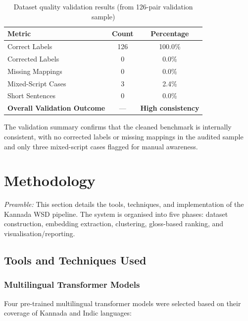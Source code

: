 \documentclass[12pt,a4paper,oneside]{article}
\begin{document}
\begin{table}[H]
\centering
\caption{Dataset quality validation results (from 126-pair validation sample)}
\label{tab:quality}
\begin{tabular}{l c c}
\toprule
\textbf{Metric} & \textbf{Count} & \textbf{Percentage} \\
\midrule
Correct Labels & 126 & 100.0\% \\
Corrected Labels & 0 & 0.0\% \\
Missing Mappings & 0 & 0.0\% \\
Mixed-Script Cases & 3 & 2.4\% \\
Short Sentences & 0 & 0.0\% \\
\midrule
\textbf{Overall Validation Outcome} & --- & \textbf{High consistency} \\
\bottomrule
\end{tabular}
\end{table}

The validation summary confirms that the cleaned benchmark is internally consistent, with no corrected labels or missing mappings in the audited sample and only three mixed-script cases flagged for manual awareness.

\clearpage

\section{Methodology}

\textit{Preamble:} This section details the tools, techniques, and implementation of the Kannada WSD pipeline. The system is organised into five phases: dataset construction, embedding extraction, clustering, gloss-based ranking, and visualisation/reporting.

\subsection{Tools and Techniques Used}

\subsubsection{Multilingual Transformer Models}

Four pre-trained multilingual transformer models were selected based on their coverage of Kannada and Indic languages:
\end{document}
